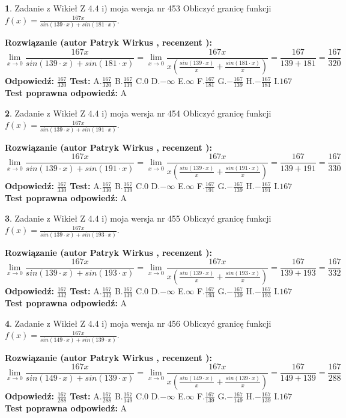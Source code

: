 \documentclass[12pt, a4paper]{article}
\theoremstyle{definition} %
\newtheorem{zad}{}
\newcommand{\zadStart}[1]{\begin{zad}#1\newline}
\newcommand{\zadStop}{\end{zad}}
\newcommand{\rozwStart}[2]{\noindent \textbf{Rozwiązanie (autor #1 , recenzent #2): }\newline}
\newcommand{\rozwStop}{\newline}
\newcommand{\odpStart}{\noindent \textbf{Odpowiedź:}\newline}
\newcommand{\odpStop}{\newline}
\newcommand{\testStart}{\noindent \textbf{Test:}\newline}
\newcommand{\testStop}{\newline}
\newcommand{\kluczStart}{\noindent \textbf{Test poprawna odpowiedź:}\newline}
\newcommand{\kluczStop}{\newline}
\begin{document}
\zadStart{Zadanie z Wikieł Z 4.4 i) moja wersja nr 453}
Obliczyć granicę funkcji $f(x)=\frac{167x}{sin(139\cdot x) +sin(181\cdot x)}$.
\zadStop
\rozwStart{Patryk Wirkus}{}
$$\lim\limits_{x\to 0}\frac{167x}{sin(139\cdot x) +sin(181\cdot x)}=\lim\limits_{x\to 0}\frac{167x}{x(\frac{sin(139\cdot x)}{x}+\frac{sin(181\cdot x)}{x})}=\frac{167}{139+181} = \frac{167}{320}$$
\rozwStop
\odpStart
$\frac{167}{320}$
\odpStop
\testStart
A.$\frac{167}{320}$
B.$\frac{167}{139}$
C.$0$
D.$-\infty$
E.$\infty$
F.$\frac{167}{181}$
G.$-\frac{167}{139}$
H.$-\frac{167}{181}$
I.$167$
\testStop
\kluczStart
A
\kluczStop



\zadStart{Zadanie z Wikieł Z 4.4 i) moja wersja nr 454}
Obliczyć granicę funkcji $f(x)=\frac{167x}{sin(139\cdot x) +sin(191\cdot x)}$.
\zadStop
\rozwStart{Patryk Wirkus}{}
$$\lim\limits_{x\to 0}\frac{167x}{sin(139\cdot x) +sin(191\cdot x)}=\lim\limits_{x\to 0}\frac{167x}{x(\frac{sin(139\cdot x)}{x}+\frac{sin(191\cdot x)}{x})}=\frac{167}{139+191} = \frac{167}{330}$$
\rozwStop
\odpStart
$\frac{167}{330}$
\odpStop
\testStart
A.$\frac{167}{330}$
B.$\frac{167}{139}$
C.$0$
D.$-\infty$
E.$\infty$
F.$\frac{167}{191}$
G.$-\frac{167}{139}$
H.$-\frac{167}{191}$
I.$167$
\testStop
\kluczStart
A
\kluczStop



\zadStart{Zadanie z Wikieł Z 4.4 i) moja wersja nr 455}
Obliczyć granicę funkcji $f(x)=\frac{167x}{sin(139\cdot x) +sin(193\cdot x)}$.
\zadStop
\rozwStart{Patryk Wirkus}{}
$$\lim\limits_{x\to 0}\frac{167x}{sin(139\cdot x) +sin(193\cdot x)}=\lim\limits_{x\to 0}\frac{167x}{x(\frac{sin(139\cdot x)}{x}+\frac{sin(193\cdot x)}{x})}=\frac{167}{139+193} = \frac{167}{332}$$
\rozwStop
\odpStart
$\frac{167}{332}$
\odpStop
\testStart
A.$\frac{167}{332}$
B.$\frac{167}{139}$
C.$0$
D.$-\infty$
E.$\infty$
F.$\frac{167}{193}$
G.$-\frac{167}{139}$
H.$-\frac{167}{193}$
I.$167$
\testStop
\kluczStart
A
\kluczStop



\zadStart{Zadanie z Wikieł Z 4.4 i) moja wersja nr 456}
Obliczyć granicę funkcji $f(x)=\frac{167x}{sin(149\cdot x) +sin(139\cdot x)}$.
\zadStop
\rozwStart{Patryk Wirkus}{}
$$\lim\limits_{x\to 0}\frac{167x}{sin(149\cdot x) +sin(139\cdot x)}=\lim\limits_{x\to 0}\frac{167x}{x(\frac{sin(149\cdot x)}{x}+\frac{sin(139\cdot x)}{x})}=\frac{167}{149+139} = \frac{167}{288}$$
\rozwStop
\odpStart
$\frac{167}{288}$
\odpStop
\testStart
A.$\frac{167}{288}$
B.$\frac{167}{149}$
C.$0$
D.$-\infty$
E.$\infty$
F.$\frac{167}{139}$
G.$-\frac{167}{149}$
H.$-\frac{167}{139}$
I.$167$
\testStop
\kluczStart
A
\kluczStop
\end{document}
